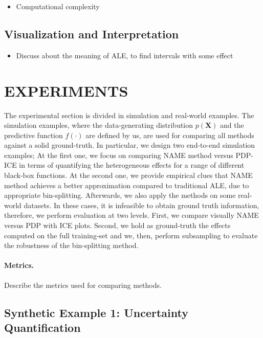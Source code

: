 \documentclass[twoside]{article}
\begin{document}
\noindent

\begin{itemize}
\item Computational complexity
\end{itemize}

\subsection{Visualization and Interpretation}
\label{sec:visualization}

\begin{itemize}
\item Discuss about the meaning of ALE, to find intervals with some effect
\end{itemize}

\clearpage
\section{EXPERIMENTS}

The experimental section is divided in simulation and real-world
examples. The simulation examples, where the data-generating
distribution \(p(\mathbf{X})\) and the predictive function
\(f(\cdot)\) are defined by us, are used for comparing all methods
against a solid ground-truth. In particular, we design two end-to-end
simulation examples; At the first one, we focus on comparing NAME
method versus PDP-ICE in terms of quantifying the heterogeneous
effects for a range of different black-box functions. At the second
one, we provide empirical clues that NAME method achieves a better
approximation compared to traditional ALE, due to appropriate
bin-splitting. Afterwards, we also apply the methods on some
real-world datasets. In these cases, it is infeasible to obtain ground
truth information, therefore, we perform evaluation at two
levels. First, we compare visually NAME versus PDP with ICE
plots. Second, we hold as ground-truth the effects computed on the
full training-set and we, then, perform subsampling to evaluate the
robustness of the bin-splitting method.

\paragraph{Metrics.} Describe the metrics used for comparing methods.

\subsection{Synthetic Example 1: Uncertainty Quantification}
\end{document}
